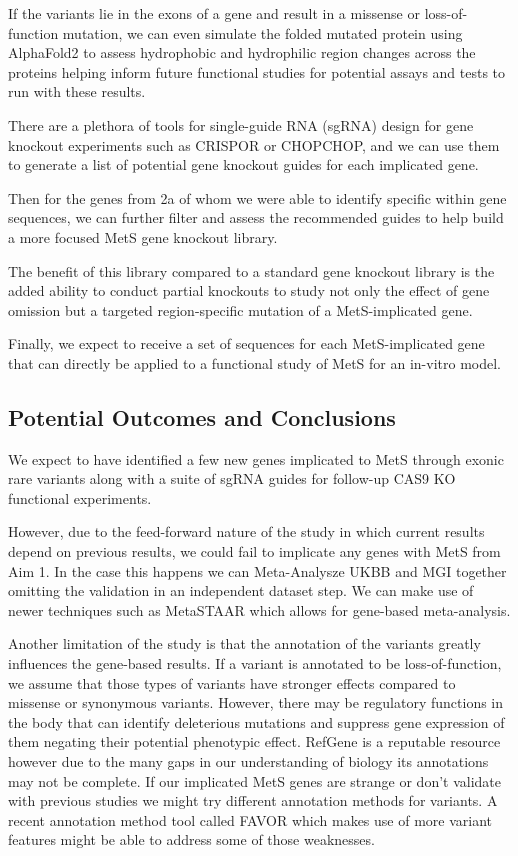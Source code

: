 \documentclass[11pt]{article}
\begin{document}
If the variants lie in the exons of a gene and result in a missense or loss-of-function mutation, we can even simulate the folded mutated protein using AlphaFold2 to assess hydrophobic and hydrophilic region changes across the proteins helping inform future functional studies for potential assays and tests to run with these results.

There are a plethora of tools for single-guide RNA (sgRNA) design for gene knockout experiments such as CRISPOR or CHOPCHOP, and we can use them to generate a list of potential gene knockout guides for each implicated gene.

Then for the genes from 2a of whom we were able to identify specific within gene sequences, we can further filter and assess the recommended guides to help build a more focused MetS gene knockout library.

The benefit of this library compared to a standard gene knockout library is the added ability to conduct partial knockouts to study not only the effect of gene omission but a targeted region-specific mutation of a MetS-implicated gene.

Finally, we expect to receive a set of sequences for each MetS-implicated gene that can directly be applied to a functional study of MetS for an in-vitro model.


\subsection*{Potential Outcomes and Conclusions}

We expect to have identified a few new genes implicated to MetS through exonic rare variants along with a suite of sgRNA guides for follow-up CAS9 KO functional experiments. 

However, due to the feed-forward nature of the study in which current results depend on previous results, we could fail to implicate any genes with MetS from Aim 1. In the case this happens we can Meta-Analysze UKBB and MGI together omitting the validation in an independent dataset step. We can make use of newer techniques such as MetaSTAAR which allows for gene-based meta-analysis.

Another limitation of the study is that the annotation of the variants greatly influences the gene-based results. If a variant is annotated to be loss-of-function, we assume that those types of variants have stronger effects compared to missense or synonymous variants. However, there may be regulatory functions in the body that can identify deleterious mutations and suppress gene expression of them negating their potential phenotypic effect. RefGene is a reputable resource however due to the many gaps in our understanding of biology its annotations may not be complete. If our implicated MetS genes are strange or don't validate with previous studies we might try different annotation methods for variants. A recent annotation method tool called FAVOR which makes use of more variant features might be able to address some of those weaknesses.
\end{document}
